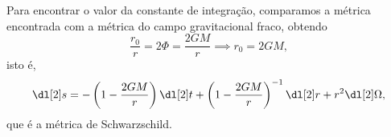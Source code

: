 Para encontrar o valor da constante de integração, comparamos a métrica encontrada com a métrica do campo gravitacional fraco, obtendo
\begin{equation*}
    \frac{r_0}{r} = 2 \Phi = \frac{2GM}{r} \implies r_0 = 2GM,
\end{equation*}
isto é,
\begin{equation*}
    \dl[2]s = -\left(1 - \frac{2GM}{r}\right)\dl[2]t + \left(1 - \frac{2GM}{r}\right)^{-1}\dl[2]r + r^2 \dl[2]\Omega,
\end{equation*}
que é a métrica de Schwarzschild.
